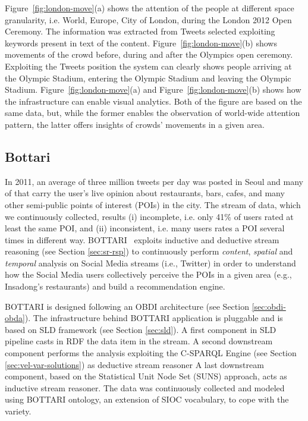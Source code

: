Figure~\ref{fig:london-move}(a) shows the attention of the people at different space granularity, i.e. World, Europe, City of London, during the London 2012 Open Ceremony. The information was extracted from Tweets selected exploiting keywords present in text of the content.
Figure~\ref{fig:london-move}(b) shows movements of the crowd before, during and after the Olympics open ceremony. Exploiting the Tweets position the system can clearly shows people arriving at the Olympic Stadium, entering the Olympic Stadium and leaving the Olympic Stadium.
Figure~\ref{fig:london-move}(a) and Figure~\ref{fig:london-move}(b) shows how the infrastructure can enable visual analytics. 
Both of the figure are based on the same data, but, while the former enables the observation of world-wide attention pattern, the latter offers insights of crowds' movements in a given area.

\subsection{Bottari} \label{sec:uda-bottari}
In 2011, an average of three million tweets per day was posted in Seoul and many of that carry the user's live opinion about restaurants, bars, cafes, and many other semi-public points of interest (POIs) in the city. 
The stream of data, which we continuously collected, results (i) incomplete, i.e. only 41\% of users rated at least the same POI, and (ii) inconsistent, i.e. many users rates a POI several times in different way.
BOTTARI~\cite{DBLP:journals/ws/BalduiniCDVHLKT12} exploits inductive and deductive stream reasoning (see Section \ref{sec:sr-rsp}) to continuously perform \textit{content}, \textit{spatial} and \textit{temporal} analysis on Social Media streams (i.e., Twitter) in order to understand how the Social Media users collectively perceive the POIs in a given area (e.g., Insadong's restaurants) and build a recommendation engine.

BOTTARI is designed following an OBDI architecture (see Section \ref{sec:obdi-obda}). 
The infrastructure behind BOTTARI application is pluggable and is based on SLD framework (see Section \ref{sec:sld}). 
A first component in SLD pipeline casts in RDF the data item in the stream. 
A second downstream component performs the analysis exploiting the C-SPARQL Engine (see Section \ref{sec:vel-var-solutions}) as deductive stream reasoner
A last downstream component, based on the Statistical Unit Node Set (SUNS) \cite{tresp2009materializing,huang2010multivariate} approach, acts as inductive stream reasoner.
The data was continuously collected and modeled using BOTTARI ontology, an extension of SIOC vocabulary, to cope with the variety.

